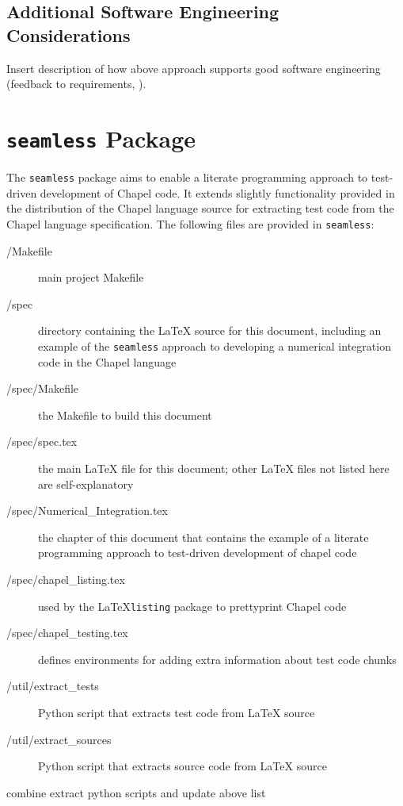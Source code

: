 \subsection{Additional Software Engineering Considerations}

\begin{TODO}
Insert description of how above approach supports good software engineering (feedback to requirements, \etc).
\end{TODO}

\section{\texttt{seamless} Package}
The \lstinline{seamless} package aims to enable a literate programming approach to test-driven
development of Chapel code. It extends slightly functionality provided in the distribution
of the Chapel language source for extracting test code from the Chapel language specification.
The following files are provided in \lstinline{seamless}:
\begin{description}
\item[/Makefile] main project Makefile
\item[/spec] directory containing the \LaTeX\xspace source for this document, including an 
example of the \lstinline{seamless} approach to developing a numerical integration code in the Chapel language
\item[/spec/Makefile] the Makefile to build this document
\item[/spec/spec.tex] the main \LaTeX\xspace file for this document; other \LaTeX\xspace files not 
listed here are self-explanatory
\item[/spec/Numerical\_Integration.tex] the chapter of this document that contains the example of a literate
programming approach to test-driven development of chapel code
\item[/spec/chapel\_listing.tex] used by the \LaTeX\xspace \lstinline{listing} package to prettyprint Chapel code
\item[/spec/chapel\_testing.tex] defines environments for adding extra information about
test code chunks 
\item[/util/extract\_tests] Python script that extracts test code from \LaTeX\xspace source
\item[/util/extract\_sources] Python script that extracts source code from \LaTeX\xspace source 
\end{description}
\begin{TODO}
combine extract python scripts and update above list
\end{TODO}

